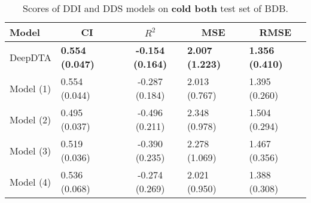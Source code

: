 \begin{table}[H]
\centering
\caption{Scores of DDI and DDS models on \textbf{cold both} test set of BDB.}
\label{tab:ddi_ci_r2}
\begin{tabular}{|l|l|c|l|l|} 
\hline
Model & \multicolumn{1}{c|}{CI} & $R^2$ & \multicolumn{1}{c|}{MSE} & \multicolumn{1}{c|}{RMSE} \\ 
\hline
DeepDTA & \textbf{0.554 (0.047)} & \textbf{-0.154 (0.164)} & \textbf{2.007 (1.223)} & \textbf{1.356 (0.410)} \\ 
\hline
Model (1) & 0.554 (0.044) & -0.287 (0.184) & 2.013 (0.767) & 1.395 (0.260) \\ 
\hline
Model (2) & 0.495 (0.037) & -0.496 (0.211) & 2.348 (0.978) & 1.504 (0.294) \\ 
\hline
Model (3) & 0.519 (0.036) & -0.390 (0.235) & 2.278 (1.069) & 1.467 (0.356) \\ 
\hline
Model (4) & 0.536 (0.068) & -0.274 (0.269) & 2.021 (0.950) & 1.388 (0.308) \\
\hline
\end{tabular}
\label{tab:ddi_vs_dds_cold_both}
\end{table}